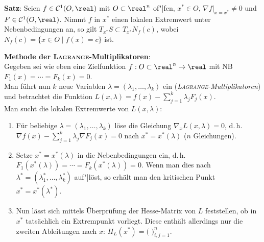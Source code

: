 \textbf{Satz}:
Seien $f \in \C^1(O, \real)$ mit $O \subset \real^n$ of"|fen,
$x^\ast \in O$, $\nabla f|_{x=x^\ast} \not= 0$ und $F \in \C^1(O, \real)$.
Nimmt $f$ in $x^\ast$ einen lokalen Extremwert unter Nebenbedingungen an,
so gilt $T_{x^\ast} S \subset T_{x^\ast} N_f(c)$, wobei
$N_f(c) = \{x \in O \;|\; f(x) = c\}$ ist.

\linie

\textbf{Methode der \textsc{Lagrange}-Multiplikatoren}: \\
Gegeben sei wie eben eine Zielfunktion $f: O \subset \real^n \rightarrow \real$
mit NB $F_1(x) = \dotsb = F_k(x) = 0$. \\
Man führt nun $k$ neue Variablen $\lambda = (\lambda_1, \dotsc, \lambda_k)$ ein
(\emph{\textsc{Lagrange}-Multiplikatoren}) und betrachtet die Funktion
$L(x, \lambda) = f(x) - \sum_{j=1}^k \lambda_j F_j(x)$. \\
Man sucht die lokalen Extremwerte von $L(x, \lambda)$:
\begin{enumerate}
    \item
    Für beliebige $\lambda = (\lambda_1, \dotsc, \lambda_k)$
    löse die Gleichung $\nabla_x L(x, \lambda) = 0$, d.\,h. \\
    $\nabla f(x) - \sum_{j=1}^k \lambda_j \nabla F_j(x) = 0$
    nach $x^\ast = x^\ast(\lambda)$
    ($n$ Gleichungen).

    \item
    Setze $x^\ast = x^\ast(\lambda)$ in die Nebenbedingungen ein, d.\,h.
    $F_1(x^\ast(\lambda)) = \dotsb = F_k(x^\ast(\lambda)) = 0$.
    Wenn man dies nach
    $\lambda^\ast = (\lambda_1^\ast, \dotsc, \lambda_k^\ast)$ auf"|löst, so
    erhält man den kritischen Punkt \\
    $x^\ast = x^\ast(\lambda^\ast)$.

    \item
    Nun lässt sich mittels Überprüfung der Hesse-Matrix von $L$ feststellen,
    ob in $x^\ast$ tatsächlich ein Extrempunkt vorliegt.
    Diese enthält allerdings nur die zweiten Ableitungen nach $x$:
    $H_L(x^\ast) = \Big($%
    $\Big)_{i,j=1}^n$.
\end{enumerate}

\pagebreak

